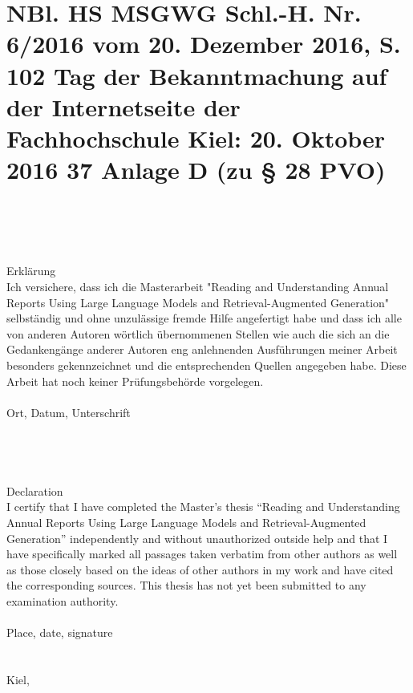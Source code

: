\chapter{NBl. HS MSGWG Schl.-H. Nr. 6/2016 vom 20. Dezember 2016, S. 102 Tag der Bekanntmachung auf der Internetseite der Fachhochschule Kiel: 20. Oktober 2016 37 Anlage D (zu § 28 PVO)}
\\
\\
\\
\\
Erklärung \\

Ich versichere, dass ich die Masterarbeit "Reading and Understanding Annual Reports Using Large Language Models and Retrieval-Augmented Generation" selbständig und ohne unzulässige fremde Hilfe angefertigt habe und dass ich alle von anderen Autoren wörtlich übernommenen Stellen wie auch die sich an die Gedankengänge anderer Autoren eng anlehnenden Ausführungen meiner Arbeit besonders gekennzeichnet und die entsprechenden Quellen angegeben habe. Diese Arbeit hat noch keiner Prüfungsbehörde vorgelegen. \\
\\
Ort, Datum, Unterschrift
\\
\\
\\
\\
\\
Declaration\\


I certify that I have completed the Master's thesis “Reading and Understanding Annual Reports Using Large Language Models and Retrieval-Augmented Generation” independently and without unauthorized outside help and that I have specifically marked all passages taken verbatim from other authors as well as those closely based on the ideas of other authors in my work and have cited the corresponding sources. This thesis has not yet been submitted to any examination authority.\\
\\
Place, date, signature
\\
\\
\\
Kiel,    \DATE
